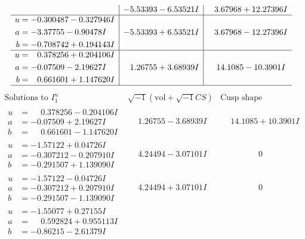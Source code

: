 \documentclass[1p]{elsarticle_modified}
\theoremstyle{definition}
\newcommand{\I}{\sqrt{-1}}
\begin{document}
$$\begin{array}{c|c|c}
 & -5.53393 - 6.53521 I & \phantom{-}3.67968 + 12.27396 I \\ \hline\begin{aligned}
u &= -0.300487 - 0.327946 I \\
a &= -3.37755 - 0.90478 I \\
b &= -0.708742 + 0.194143 I\end{aligned}
 & -5.53393 + 6.53521 I & \phantom{-}3.67968 - 12.27396 I \\ \hline\begin{aligned}
u &= \phantom{-}0.378256 + 0.204106 I \\
a &= -0.07509 - 2.19627 I \\
b &= \phantom{-}0.661601 + 1.147620 I\end{aligned}
 & \phantom{-}1.26755 + 3.68939 I & \phantom{-}14.1085 - 10.3901 I\\
 \hline 
 \end{array}$$\newpage$$\begin{array}{c|c|c}  
\text{Solutions to }I^u_{1}& \I (\text{vol} + \sqrt{-1}CS) & \text{Cusp shape}\\
 \hline 
\begin{aligned}
u &= \phantom{-}0.378256 - 0.204106 I \\
a &= -0.07509 + 2.19627 I \\
b &= \phantom{-}0.661601 - 1.147620 I\end{aligned}
 & \phantom{-}1.26755 - 3.68939 I & \phantom{-}14.1085 + 10.3901 I \\ \hline\begin{aligned}
u &= -1.57122 + 0.04726 I \\
a &= -0.307212 - 0.207910 I \\
b &= -0.291507 + 1.139090 I\end{aligned}
 & \phantom{-}4.24494 - 3.07101 I & \phantom{-0.000000 } 0 \\ \hline\begin{aligned}
u &= -1.57122 - 0.04726 I \\
a &= -0.307212 + 0.207910 I \\
b &= -0.291507 - 1.139090 I\end{aligned}
 & \phantom{-}4.24494 + 3.07101 I & \phantom{-0.000000 } 0 \\ \hline\begin{aligned}
u &= -1.55077 + 0.27155 I \\
a &= \phantom{-}0.592824 + 0.955113 I \\
b &= -0.86215 - 2.61379 I\end{aligned}

\end{array}$$
\end{document}
